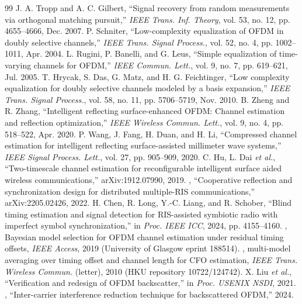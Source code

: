 \begin{thebibliography}{99}
 J. A. Tropp and A. C. Gilbert, ``Signal recovery from random measurements via orthogonal matching pursuit,'' \emph{IEEE Trans. Inf. Theory}, vol. 53, no. 12, pp. 4655--4666, Dec. 2007.
 P. Schniter, ``Low-complexity equalization of OFDM in doubly selective channels,'' \emph{IEEE Trans. Signal Process.}, vol. 52, no. 4, pp. 1002--1011, Apr. 2004.
 L. Rugini, P. Banelli, and G. Leus, ``Simple equalization of time-varying channels for OFDM,'' \emph{IEEE Commun. Lett.}, vol. 9, no. 7, pp. 619--621, Jul. 2005.
 T. Hrycak, S. Das, G. Matz, and H. G. Feichtinger, ``Low complexity equalization for doubly selective channels modeled by a basis expansion,'' \emph{IEEE Trans. Signal Process.}, vol. 58, no. 11, pp. 5706--5719, Nov. 2010.
 B. Zheng and R. Zhang, ``Intelligent reflecting surface-enhanced OFDM: Channel estimation and reflection optimization,'' \emph{IEEE Wireless Commun. Lett.}, vol. 9, no. 4, pp. 518--522, Apr. 2020.
 P. Wang, J. Fang, H. Duan, and H. Li, ``Compressed channel estimation for intelligent reflecting surface-assisted millimeter wave systems,'' \emph{IEEE Signal Process. Lett.}, vol. 27, pp. 905--909, 2020.
 C. Hu, L. Dai \emph{et al.}, ``Two-timescale channel estimation for reconfigurable intelligent surface aided wireless communications,'' arXiv:1912.07990, 2019. 
 , ``Cooperative reflection and synchronization design for distributed multiple-RIS communications,'' arXiv:2205.02426, 2022.
 H. Chen, R. Long, Y.-C. Liang, and R. Schober, ``Blind timing estimation and signal detection for RIS-assisted symbiotic radio with imperfect symbol synchronization,'' in \emph{Proc. IEEE ICC}, 2024, pp. 4155--4160.
 , Bayesian model selection for OFDM channel estimation under residual timing offsets, \emph{IEEE Access}, 2019 (University of Glasgow eprint 188514).
 , multi-model averaging over timing offset and channel length for CFO estimation, \emph{IEEE Trans. Wireless Commun.} (letter), 2010 (HKU repository 10722/124742).
 X. Liu \emph{et al.}, ``Verification and redesign of OFDM backscatter,'' in \emph{Proc. USENIX NSDI}, 2021. 
 , ``Inter-carrier interference reduction technique for backscattered OFDM,'' 2024. 

\end{thebibliography}
